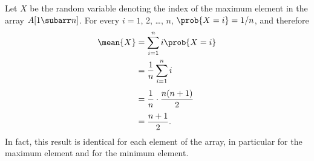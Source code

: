 Let $X$ be the random variable denoting the index of the maximum element in the array $A[1\subarr n]$.
For every $i=1$, 2, \dots, $n$, $\prob{X=i}=1/n$, and therefore
\begin{align*}
    \mean{X} &= \sum_{i=1}^ni\prob{X=i} \\
    &= \frac{1}{n}\sum_{i=1}^ni \\[1mm]
    &= \frac{1}{n}\cdot\frac{n(n+1)}{2} \\[1mm]
    &= \frac{n+1}{2}.
\end{align*}
In fact, this result is identical for each element of the array, in particular for the maximum element and for the minimum element.
